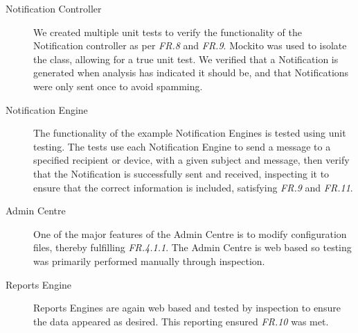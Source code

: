 \documentclass[10pt,a4paper]{article}
\begin{document}
\begin{description}
  \item[Notification Controller] We created multiple unit tests to verify the functionality of the Notification controller as per \emph{FR.8} and \emph{FR.9}. Mockito was used to isolate the class, allowing for a true unit test. We verified that a Notification is generated when analysis has indicated it should be, and that Notifications were only sent once to avoid spamming.

  \item[Notification Engine] The functionality of the example Notification Engines is tested using unit testing. The tests use each Notification Engine to send a message to a specified recipient or device, with a given subject and message, then verify that the  Notification is successfully sent and received, inspecting it to ensure that the correct information is included, satisfying \emph{FR.9} and \emph{FR.11}.

  \item[Admin Centre] One of the major features of the Admin Centre is to modify configuration files, thereby fulfilling \emph{FR.4.1.1}. The Admin Centre is web based so testing was primarily performed manually through inspection.

  \item[Reports Engine] Reports Engines are again web based and tested by inspection to ensure the data appeared as desired. This reporting ensured \emph{FR.10} was met.

\end{description}
\end{document}
